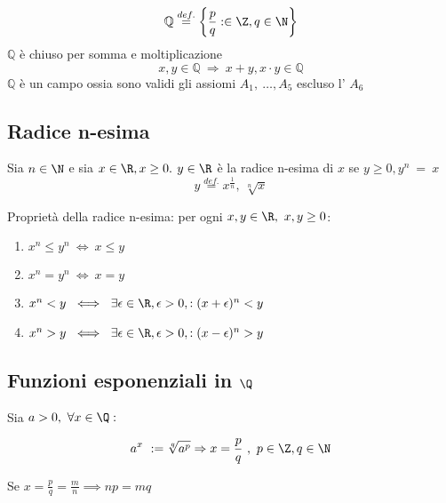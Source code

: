 \documentclass[../analisi.tex]{subfiles}
\begin{document}
\begin{defn}
	\begin{equation}
		\mathbb{Q} \overset{def.}{=} \left\{ \frac{p}{q}: \in \Z,q \in \N \right\}
	\end{equation}
$\mathbb{Q}$ è chiuso per somma e moltiplicazione
\begin{equation} 
	x,y \in \mathbb{Q}\ \Rightarrow\ x+y, x \cdot y \in \mathbb{Q}
\end{equation}
$\mathbb{Q}$ è un campo  ossia sono validi gli assiomi $A_1,\ \dots, A_5$ escluso l' $A_6$
\end{defn}

\subsection{Radice n-esima}
Sia $n\in \N$ e sia $x\in \R, x \geq 0. \newline$
$y \in \R$ è la radice n-esima di $x$ se $ y \geq 0, y^n\ =\ x$
\begin{equation}
y \overset{def.}{=} x^{\frac{1}{n}},\ \sqrt[n]{x}
\end{equation}

\begin{defn}
	Proprietà della radice n-esima: per ogni $x,y \in \R,\ x,y \geq 0$:
	\begin{enumerate}[label = $P_{\arabic*}$]
		\item $x^n \leq y^n\ \iff\ x \leq y$
		\item $x^n = y^n\ \iff\ x=y$
		\item $x^n < y\ \iff\ \exists \epsilon \in \R, \epsilon > 0, : (x+\epsilon)^n <y$
		\item $x^n > y\ \iff\ \exists \epsilon \in \R, \epsilon > 0, : (x-\epsilon)^n>y$
\end{enumerate}
\end{defn}

\subsection{Funzioni esponenziali in $\Q$}

\begin{defn}
	Sia $ a > 0,\ \forall x \in \Q: $

	\begin{equation}
	a^x\ := \sqrt[q]{a^p} \Rightarrow x = \frac{p}{q}\ ,\ p \in \Z, q\in \N
	\end{equation}
\end{defn}
Se $ x = \frac{p}{q} = \frac{m}{n} \implies np = mq$
\end{document}
